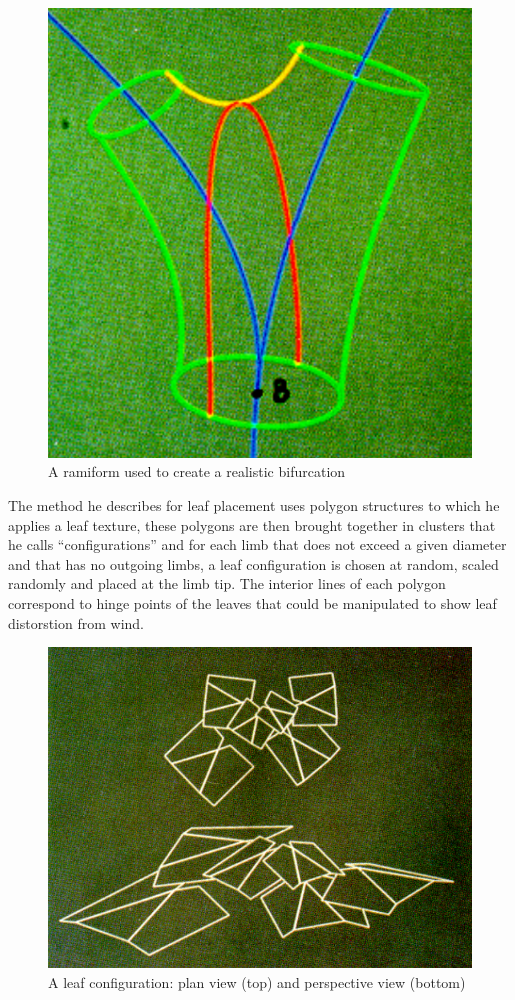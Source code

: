 \documentclass[final]{cmpreport}
\begin{document}
\begin{figure}[ht]
    \includegraphics[scale=0.6]{bloomenthal-ramiform.PNG}
    \centering
    \captionsetup{justification=centering}
    \caption{A ramiform used to create a realistic bifurcation}
    \label{fig:bloomenthal-ramiform}
\end{figure}

\pagebreak
The method he describes for leaf placement uses polygon structures to which he applies 
a leaf texture, these polygons are then brought together in clusters that he calls 
``configurations'' and for each limb that does not exceed a given diameter and that has 
no outgoing limbs, a leaf configuration is chosen at random, scaled randomly and placed 
at the limb tip. The interior lines of each polygon correspond to hinge points of the 
leaves that could be manipulated to show leaf distorstion from wind. 

\begin{figure}[ht]
    \includegraphics[scale=0.3]{bloomenthal-leaves.PNG}
    \centering
    \captionsetup{justification=centering}
    \caption{A leaf configuration: plan view (top) and perspective view (bottom)}
    \label{fig:bloomenthal-leaves}
\end{figure}



\pagebreak

\end{document}
